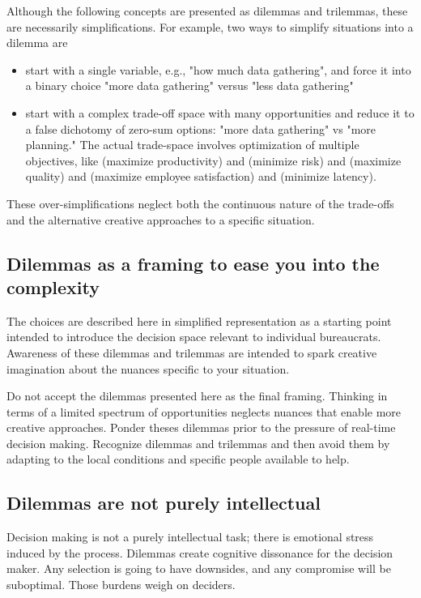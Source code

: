 Although the following concepts are presented as dilemmas and trilemmas, these are necessarily simplifications. For example, two ways to simplify situations into a dilemma are
\begin{itemize}
    \item start with a single variable, e.g., "how much data gathering", and force it into a binary choice "more data gathering" versus "less data gathering"
    
    \item start with a complex trade-off space with many opportunities and reduce it to a false dichotomy of zero-sum options: "more data gathering" vs "more planning." The actual trade-space involves optimization of multiple objectives, like (maximize productivity) and (minimize risk) and (maximize quality) and (maximize employee satisfaction) and (minimize latency). 
\end{itemize}
These over-simplifications neglect both the continuous nature of the trade-offs and the alternative creative approaches to a specific situation. 

\subsection{Dilemmas as a framing to ease you into the complexity}
The choices are described here in simplified representation as a starting point intended to introduce the decision space relevant to individual bureaucrats. Awareness of these dilemmas and trilemmas are intended to spark creative imagination about the nuances specific to your situation.

Do not accept the dilemmas presented here as the final framing. Thinking in terms of a limited spectrum of opportunities neglects nuances that enable more creative approaches. Ponder theses dilemmas prior to the pressure of real-time decision making.  Recognize dilemmas and trilemmas and then avoid them by adapting to the local conditions and specific people available to help.

\subsection{Dilemmas are not purely intellectual}
Decision making is not a purely intellectual task; there is emotional stress induced by the process. Dilemmas create cognitive dissonance for the decision maker. Any selection is going to have downsides, and any compromise will be suboptimal. Those burdens weigh on deciders.

